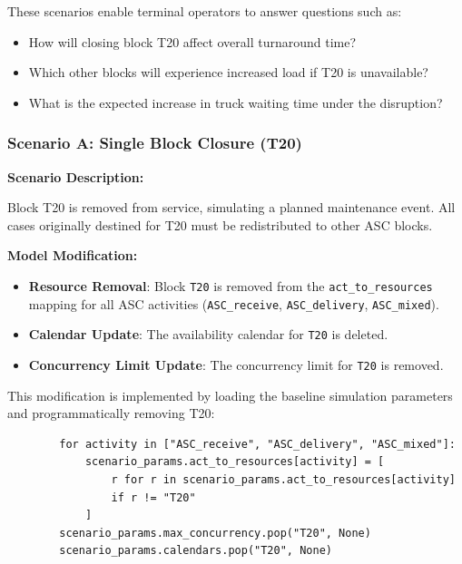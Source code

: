         These scenarios enable terminal operators to answer questions such as:
        
        \begin{itemize}
            \item How will closing block T20 affect overall turnaround time?
            \item Which other blocks will experience increased load if T20 is unavailable?
            \item What is the expected increase in truck waiting time under the disruption?
        \end{itemize}

        \subsubsection{Scenario A: Single Block Closure (T20)}
        
        \textbf{Scenario Description:}
        
        Block T20 is removed from service, simulating a planned maintenance event. All cases originally destined for T20 must be redistributed to other ASC blocks.
        
        \textbf{Model Modification:}
        
        \begin{itemize}
            \item \textbf{Resource Removal}: Block \texttt{T20} is removed from the \texttt{act\_to\_resources} mapping for all ASC activities (\texttt{ASC\_receive}, \texttt{ASC\_delivery}, \texttt{ASC\_mixed}).
            \item \textbf{Calendar Update}: The availability calendar for \texttt{T20} is deleted.
            \item \textbf{Concurrency Limit Update}: The concurrency limit for \texttt{T20} is removed.
        \end{itemize}
        
        This modification is implemented by loading the baseline simulation parameters and programmatically removing T20:
        
        \begin{verbatim}
        for activity in ["ASC_receive", "ASC_delivery", "ASC_mixed"]:
            scenario_params.act_to_resources[activity] = [
                r for r in scenario_params.act_to_resources[activity]
                if r != "T20"
            ]
        scenario_params.max_concurrency.pop("T20", None)
        scenario_params.calendars.pop("T20", None)
        \end{verbatim}
        
